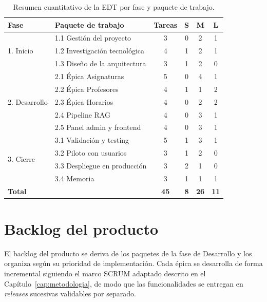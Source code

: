 \begin{table}[hbtp]
\centering
\begin{tabular}{|l|l|c|c|c|c|}
\hline
\textbf{Fase} & \textbf{Paquete de trabajo} & \textbf{Tareas} & \textbf{S} & \textbf{M} & \textbf{L} \\ \hline
\multirow{3}{*}{1. Inicio}
  & 1.1 Gestión del proyecto         & 3 & 0 & 2 & 1 \\ \cline{2-6}
  & 1.2 Investigación tecnológica    & 4 & 1 & 2 & 1 \\ \cline{2-6}
  & 1.3 Diseño de la arquitectura    & 3 & 1 & 2 & 0 \\ \hline
\multirow{5}{*}{2. Desarrollo}
  & 2.1 Épica Asignaturas            & 5 & 0 & 4 & 1 \\ \cline{2-6}
  & 2.2 Épica Profesores             & 4 & 1 & 1 & 2 \\ \cline{2-6}
  & 2.3 Épica Horarios               & 4 & 0 & 2 & 2 \\ \cline{2-6}
  & 2.4 Pipeline RAG                 & 4 & 0 & 3 & 1 \\ \cline{2-6}
  & 2.5 Panel admin y frontend       & 4 & 0 & 3 & 1 \\ \hline
\multirow{4}{*}{3. Cierre}
  & 3.1 Validación y testing         & 5 & 1 & 3 & 1 \\ \cline{2-6}
  & 3.2 Piloto con usuarios          & 3 & 1 & 2 & 0 \\ \cline{2-6}
  & 3.3 Despliegue en producción     & 3 & 2 & 1 & 0 \\ \cline{2-6}
  & 3.4 Memoria                       & 3 & 1 & 1 & 1 \\ \hline
\hline
\multicolumn{2}{|l|}{\textbf{Total}} & \textbf{45} & \textbf{8} & \textbf{26} & \textbf{11} \\ \hline
\end{tabular}
\caption{Resumen cuantitativo de la EDT por fase y paquete de trabajo.}
\label{tab:resumen-edt}
\end{table}


\section{Backlog del producto}\label{sec:backlog}

El backlog del producto se deriva de los paquetes de la fase de Desarrollo y los organiza según su prioridad de implementación. Cada épica se desarrolla de forma incremental siguiendo el marco SCRUM adaptado descrito en el Capítulo~\ref{cap:metodologia}, de modo que las funcionalidades se entregan en \textit{releases} sucesivas validables por separado.

